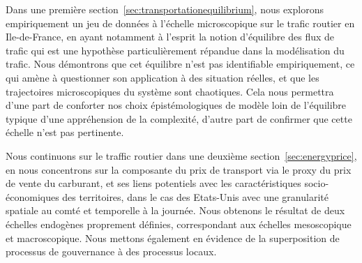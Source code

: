 Dans une première section~\ref{sec:transportationequilibrium}, nous explorons empiriquement un jeu de données à l'échelle microscopique sur le trafic routier en Ile-de-France, en ayant notamment à l'esprit la notion d'équilibre des flux de trafic qui est une hypothèse particulièrement répandue dans la modélisation du trafic. Nous démontrons que cet équilibre n'est pas identifiable empiriquement, ce qui amène à questionner son application à des situation réelles, et que les trajectoires microscopiques du système sont chaotiques. Cela nous permettra d'une part de conforter nos choix épistémologiques de modèle loin de l'équilibre typique d'une appréhension de la complexité, d'autre part de confirmer que cette échelle n'est pas pertinente.

Nous continuons sur le traffic routier dans une deuxième section~\ref{sec:energyprice}, en nous concentrons sur la composante du prix de transport via le proxy du prix de vente du carburant, et ses liens potentiels avec les caractéristiques socio-économiques des territoires, dans le cas des Etats-Unis avec une granularité spatiale au comté et temporelle à la journée. Nous obtenons le résultat de deux échelles endogènes proprement définies, correspondant aux échelles mesoscopique et macroscopique. Nous mettons également en évidence de la superposition de processus de gouvernance à des processus locaux.


\stars














